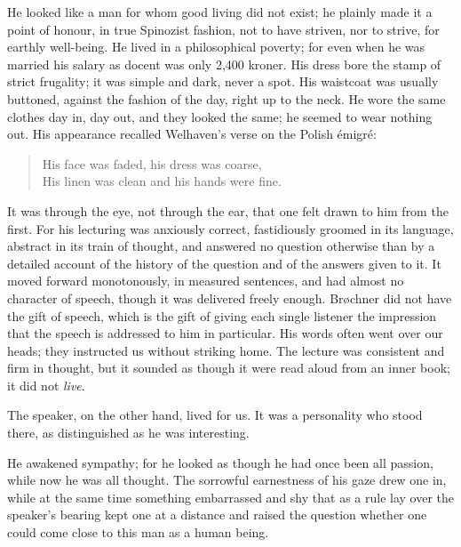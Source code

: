 \documentclass[12pt,a4paper,openany]{book}
\newcommand{\opage}[1]{\marginnote{\footnotesize\textit{[#1]}}}
\begin{document}
He looked like a man for whom good living did not exist; he plainly made it a
point of honour, in true Spinozist fashion, not to have striven, nor to strive,
for earthly well-being. He lived in
\opage{232}a philosophical poverty; for even when he was married his salary as docent
was only 2,400 kroner. His dress bore the stamp of strict frugality; it was
simple and dark, never a spot. His waistcoat was usually buttoned, against the
fashion of the day, right up to the neck. He wore the same clothes day in, day
out, and they looked the same; he seemed to wear nothing out. His appearance
recalled Welhaven's verse on the Polish émigré:

\begin{verse}\small
His face was faded, his dress was coarse, \\
His linen was clean and his hands were fine.
\end{verse}

It was through the eye, not through the ear, that one felt drawn to him from
the first. For his lecturing was anxiously correct, fastidiously groomed in
its language, abstract in its train of thought, and answered no question
otherwise than by a detailed account of the history of the question and of the
answers given to it. It moved forward monotonously, in measured sentences, and
had almost no character of speech, though it was delivered freely enough.
Brøchner did not have the gift of speech, which is the gift of giving each
single listener the impression that the speech is addressed to him in
particular. His words often went over our heads; they instructed us without
striking home. The lecture was consistent and firm in
\opage{233}thought, but it sounded as though it were read aloud from an inner book; it
did not \emph{live}.

The speaker, on the other hand, lived for us. It was a personality who stood
there, as distinguished as he was interesting.

He awakened sympathy; for he looked as though he had once been all passion,
while now he was all thought. The sorrowful earnestness of his gaze drew one
in, while at the same time something embarrassed and shy that as a rule lay
over the speaker's bearing kept one at a distance and raised the question
whether one could come close to this man as a human being.
\end{document}
